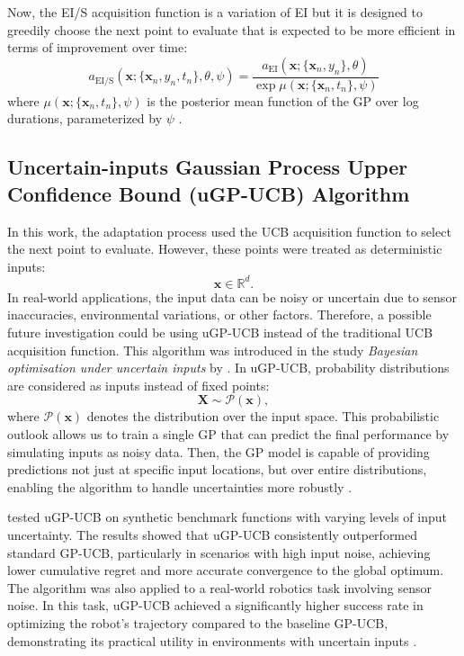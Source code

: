 \documentclass[12pt]{article}
\begin{document}
Now, the EI/S acquisition function is a variation of EI but it is designed to greedily choose the next point to evaluate that is expected to be more efficient in terms of improvement over time:
\begin{equation}
\label{eq:EI/S}
a_{\text{EI/S}}(\mathbf{x}; \{\mathbf{x}_n, y_n, t_n\}, \theta, \psi) = \frac{a_{\text{EI}}(\mathbf{x}; \{\mathbf{x}_n, y_n\}, \theta)}{\exp \mu(\mathbf{x}; \{\mathbf{x}_n, t_n\}, \psi)}
\end{equation}
where \(\mu(\mathbf{x}; \{\mathbf{x}_n, t_n\}, \psi)\) is the posterior mean function of the GP over log durations, parameterized by \(\psi\) \citep{Snoek2014BayesianOA}.   



\subsection{Uncertain-inputs Gaussian Process Upper Confidence Bound (uGP-UCB) Algorithm}
In this work, the adaptation process used the UCB acquisition function to select the next point to evaluate. However, these points were treated as deterministic inputs:
\begin{equation}
\label{eq:deterministic_input}
\mathbf{x} \in \mathbb{R}^d.
\end{equation}
In real-world applications, the input data can be noisy or uncertain due to sensor inaccuracies, environmental variations, or other factors. Therefore, a possible future investigation could be using uGP-UCB instead of the traditional UCB acquisition function. This algorithm was introduced in the study \textit{Bayesian optimisation under uncertain inputs} by \citet{oliveira2019bayesianoptimisationuncertaininputs}. In uGP-UCB, probability distributions are considered as inputs instead of fixed points:
\begin{equation}
\label{eq:input_distribution}
\mathbf{X} \sim \mathcal{P}(\mathbf{x}),
\end{equation}
where \( \mathcal{P}(\mathbf{x}) \) denotes the distribution over the input space. This probabilistic outlook allows us to train a single GP that can predict the final performance by simulating inputs as noisy data. Then, the GP model is capable of providing predictions not just at specific input locations, but over entire distributions, enabling the algorithm to handle uncertainties more robustly \citep{oliveira2019bayesianoptimisationuncertaininputs}.  

 \citet{oliveira2019bayesianoptimisationuncertaininputs} tested uGP-UCB on synthetic benchmark functions with varying levels of input uncertainty. The results showed that uGP-UCB consistently outperformed standard GP-UCB, particularly in scenarios with high input noise, achieving lower cumulative regret and more accurate convergence to the global optimum. The algorithm was also applied to a real-world robotics task involving sensor noise. In this task, uGP-UCB achieved a significantly higher success rate in optimizing the robot's trajectory compared to the baseline GP-UCB, demonstrating its practical utility in environments with uncertain inputs \citep{oliveira2019bayesianoptimisationuncertaininputs}.
 
\end{document}
